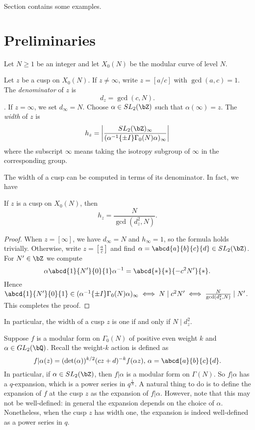 \documentclass [11pt, proquest] {uwthesis}[2015/03/03]
\begin{document}
Section contains some examples. %

\section{Preliminaries}

Let $N \geq 1$ be an integer and let $X_0(N)$ be the modular curve of level $N$. 
\begin{Definition}
Let $z$ be a cusp on $X_0(N)$.  If $z \neq \infty$, write $z = [a/c]$ with $\gcd(a,c) =1$. The {\it denominator} of $z$ is $$d_z  = \gcd(c,N).$$. If $z = \infty$, we set $d_\infty = N$. Choose $\alpha \in SL_2(\bZ)$ such that $\alpha(\infty) = z$. 
The {\it width} of $z$ is 
\[
	h_z = \left| \frac{SL_2(\bZ)_\infty}{(\alpha^{-1} \{\pm I\} \Gamma_0(N) \alpha)_\infty}\right|
\]
where the subscript $\infty$ means taking  the isotropy subgroup of $\infty$ in the corresponding group.
\end{Definition}

The width of a cusp can be computed in terms of its denominator. In fact, we have
\begin{Lemma}
If $z$ is a cusp on $X_0(N)$, then
$$h_z = \frac{N}{\gcd(d_z^2, N)}.$$
\end{Lemma}

\begin{proof}
When $z = [\infty]$, we have $d_\infty = N$ and $h_\infty =  1$, so the formula holds trivially. Otherwise, write $z = [\frac{a}{c}]$ and find $\alpha = \abcd{a}{b}{c}{d} \in SL_2(\bZ)$. For $N' \in \bZ$ we compute 
\[
	\alpha   \abcd{1}{N'}{0}{1} \alpha^{-1} = \abcd{*}{*}{-c^2N'}{*}.
\]
Hence $\abcd{1}{N'}{0}{1}  \in  (\alpha^{-1} \{\pm I\} \Gamma_0(N) \alpha)_\infty \iff N \mid c^2 N' \iff \frac{N}{\gcd(d_z^2, N)} \mid N'$. This completes the proof.
\end{proof}

In particular, the width of a cusp $z$ is one if and only if $N \mid d_z^2$. 

Suppose $f$ is a modular form on $\Gamma_0(N)$ of positive even weight $k$ and $\alpha \in GL_2(\bQ)$. Recall the weight-$k$ action is defined as 
\[
	f | \alpha (z)  = (\det(\alpha))^{k/2} (cz+d)^{-k} f(\alpha z), \, \alpha = \abcd{a}{b}{c}{d}.
\]
In particular, if $\alpha \in SL_2(\bZ)$, then $f | \alpha $ is a modular form on $\Gamma(N)$. So $f | \alpha $ has a $q$-expansion, which is a power series in $q^{\frac{1}{N}}$. A natural thing to do is to define the expansion of $f$ at the cusp $z$ as the expansion of $f | \alpha$. However,  note that this may not be well-defined: in general the expansion depends on the choice of $\alpha$. Nonetheless, when the cusp $z$ has width one, the expansion is indeed well-defined as a power series in $q$. 
\end{document}
